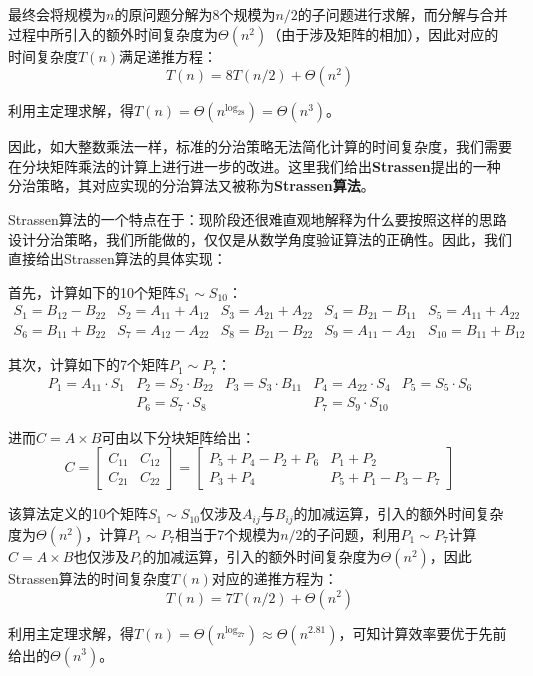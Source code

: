 \documentclass[12pt,a4paper,violet,oneside]{bbe}
\begin{document}
最终会将规模为$n$的原问题分解为$8$个规模为$n/2$的子问题进行求解，而分解与合并过程中所引入的额外时间复杂度为$\Theta(n^2)$（由于涉及矩阵的相加），因此对应的时间复杂度$T(n)$满足递推方程：
$$
T(n)=8T(n/2)+\Theta(n^2)
$$

利用主定理求解，得$T(n)=\Theta(n^{\log_28})=\Theta(n^3)$。

因此，如大整数乘法一样，标准的分治策略无法简化计算的时间复杂度，我们需要在分块矩阵乘法的计算上进行进一步的改进。这里我们给出\textbf{Strassen}提出的一种分治策略，其对应实现的分治算法又被称为\textbf{Strassen算法}。

Strassen算法的一个特点在于：现阶段还很难直观地解释为什么要按照这样的思路设计分治策略，我们所能做的，仅仅是从数学角度验证算法的正确性。因此，我们直接给出Strassen算法的具体实现：

首先，计算如下的10个矩阵$S_1\sim S_{10}$：
$$
\begin{array}{ccccc}
	S_1=B_{12}-B_{22}&S_2=A_{11}+A_{12}&S_3=A_{21}+A_{22}&S_4=B_{21}-B_{11}&S_5=A_{11}+A_{22}\\
	S_6=B_{11}+B_{22}&S_7=A_{12}-A_{22}&S_8=B_{21}-B_{22}&S_9=A_{11}-A_{21}&S_{10}=B_{11}+B_{12}
\end{array}
$$

其次，计算如下的7个矩阵$P_1\sim P_7$：
$$
\begin{array}{ccccc}
P_1=A_{11}\cdot S_1&P_2=S_2\cdot B_{22}&P_3=S_3\cdot B_{11}&P_4=A_{22}\cdot S_4&P_5=S_5\cdot S_6\\
&P_6=S_7\cdot S_8&&P_7=S_9\cdot S_{10}&
\end{array}
$$

进而$C=A\times B$可由以下分块矩阵给出：
$$
C=\left[\begin{array}{cc}
	C_{11}&C_{12}\\
	C_{21}&C_{22}
\end{array}\right]=\left[\begin{array}{cc}
	P_5+P_4-P_2+P_6&P_1+P_2\\
	P_3+P_4&P_5+P_1-P_3-P_7
\end{array}\right]
$$

该算法定义的10个矩阵$S_1\sim S_{10}$仅涉及$A_{ij}$与$B_{ij}$的加减运算，引入的额外时间复杂度为$\Theta(n^2)$，计算$P_1\sim P_7$相当于7个规模为$n/2$的子问题，利用$P_1\sim P_7$计算$C=A\times B$也仅涉及$P_i$的加减运算，引入的额外时间复杂度为$\Theta(n^2)$，因此Strassen算法的时间复杂度$T(n)$对应的递推方程为：
$$
T(n)=7T(n/2)+\Theta(n^2)
$$

利用主定理求解，得$T(n)=\Theta(n^{\log_27})\approx\Theta(n^{2.81})$，可知计算效率要优于先前给出的$\Theta(n^3)$。
\end{document}
